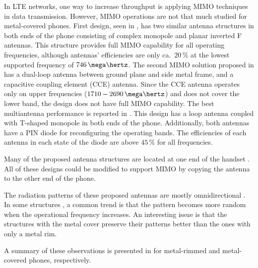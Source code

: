 In LTE networks, one way to increase throughput is applying MIMO techniques in data transmission. However, MIMO operations are not that much studied for metal-covered phones. First design, seen in \cite{son_wideband_mimo}, has two similar antenna structures in both ends of the phone consisting of complex monopole and planar inverted F antennas. This structure provides full MIMO capability for all operating frequencies, although antennas' efficiencies are only ca.\ $20\,\%$ at the lowest supported frequency of $746\,\mega\hertz$. The second MIMO solution proposed in \cite{stanley_lte_mimo} has a dual-loop antenna between ground plane and side metal frame, and a capacitive coupling element (CCE) antenna. Since the CCE antenna operates only on upper frequencies ($1710-2690\,\mega\hertz$) and does not cover the lower band, the design does not have full MIMO capability. The best multiantenna performance is reported in \cite{reconf_narrow}. This design has a loop antenna coupled with T-shaped monopole in both ends of the phone. Additionally, both antennas have a PIN diode for reconfiguring the operating bands. The efficiencies of each antenna in each state of the diode are above $45\,\%$ for all frequencies.

Many of the proposed antenna structures are located at one end of the handset \cite{hsu_compact,yuan_slot,hybrid,lee_monopole,valkonen_multifeed,chen_metal_frame,hepta_ifa,chen_compact_lte}. All of these designs could be modified to support MIMO by copying the antenna to the other end of the phone.

The radiation patterns of these proposed antennas are mostly omnidirectional \cite{lee_monopole,reconf_narrow,hsu_compact,wu_pier,zhong_pier,son_wideband_mimo}. In some structures \cite{hybrid,hepta_ifa,yuan_slot,ban_dual_loop}, a common trend is that the pattern becomes more random when the operational frequency increases. An interesting issue is that the structures with the metal cover \cite{wu_pier,zhong_pier,son_wideband_mimo} preserve their patterns better than the ones with only a metal rim.

A summary of these observations is presented in  for metal-rimmed and metal-covered phones, respectively.

